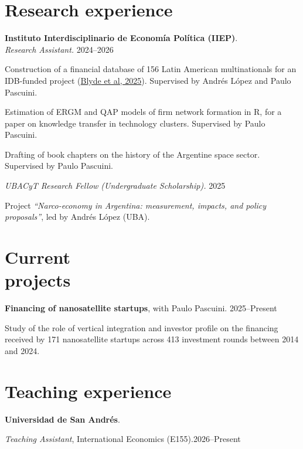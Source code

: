 \documentclass[11pt]{article}
\newcommand{\entrydate}[1]{\hfill{\small{#1}}}
\begin{document}
\section{Research experience}
\textbf{Instituto Interdisciplinario de Economía Política (IIEP)}.
\\
\textit{Research Assistant.} \entrydate{2024--2026}
\begin{cvitems}
    \item Construction of a financial database of 156 Latin American multinationals for an IDB-funded project (\href{https://publications.iadb.org/es/multilatinas-en-movimiento-caracteristicas-motivaciones-y-lineamientos-de-politica}{Blyde et al, 2025}). Supervised by Andrés López and Paulo Pascuini.
    \item Estimation of ERGM and QAP models of firm network formation in R, for a paper on knowledge transfer in technology clusters. Supervised by Paulo Pascuini.
    \item Drafting of book chapters on the history of the Argentine space sector. Supervised by Paulo Pascuini.
\end{cvitems}
\vspace{5pt}
\textit{UBACyT Research Fellow (Undergraduate Scholarship).} \entrydate{2025}
\begin{cvitems}
    \item Project \emph{``Narco-economy in Argentina: measurement, impacts, and policy proposals''}, led by Andrés López (UBA).
\end{cvitems}

\section{Current\\projects}

\textbf{Financing of nanosatellite startups}, with Paulo Pascuini. \entrydate{2025--Present}
\begin{cvitems}
  \item Study of the role of vertical integration and investor profile on the financing received by 171 nanosatellite startups across 413 investment rounds between 2014 and 2024.
\end{cvitems}

\section{Teaching experience}
\textbf{Universidad de San Andrés}.
\begin{cvitems}
  \item \textit{Teaching Assistant}, International Economics (E155).\entrydate{2026--Present}
\end{cvitems}
\end{document}
